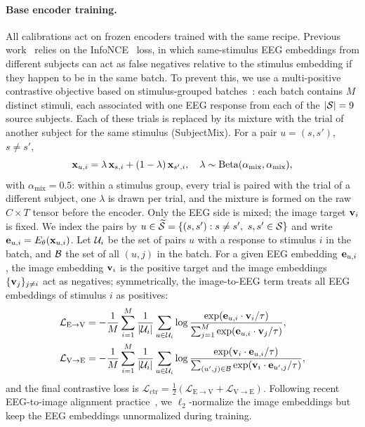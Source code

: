 \documentclass[10pt,twocolumn,letterpaper]{article}
\begin{document}
\paragraph{Base encoder training.}
All calibrations act on frozen encoders trained with the same recipe. Previous work~\cite{song2024nice,li2024atm,wu2025ubp,zhang2025neurobridge,du2025shallow} relies on the InfoNCE~\cite{oord2019cpc} loss, in which same-stimulus EEG embeddings from different subjects can act as false negatives relative to the stimulus embedding if they happen to be in the same batch. To prevent this, we use a multi-positive contrastive objective based on stimulus-grouped batches~\cite{khosla2020supcon}: each batch contains $M$ distinct stimuli, each associated with one EEG response from each of the $|{\cal S}|=9$ source subjects. Each of these trials is replaced by its mixture with the trial of another subject for the same stimulus (SubjectMix). For a pair $u=(s,s')$, $s \neq s'$,
\begin{equation}\label{eq:subjmix}
  {\bf x}_{u,i} = \lambda\,{\bf x}_{s,i} + (1 - \lambda)\,{\bf x}_{s',i},
  \quad \lambda \sim \mathrm{Beta}(\alpha_{\mathrm{mix}}, \alpha_{\mathrm{mix}}),
\end{equation}
with $\alpha_{\mathrm{mix}}=0.5$: within a stimulus group, every trial is paired with the trial of a different subject, one $\lambda$ is drawn per trial, and the mixture is formed on the raw $C\times T$ tensor before the encoder. Only the EEG side is mixed; the image target ${\bf v}_i$ is fixed. We index the pairs by $u \in \widetilde{{\cal S}} = \{(s,s') : s \neq s',\ s,s' \in {\cal S}\}$ and write ${\bf e}_{u,i} = E_\theta({\bf x}_{u,i})$. Let ${\cal U}_i$ be the set of pairs $u$ with a response to stimulus $i$ in the batch, and ${\cal B}$ the set of all $(u,j)$ in the batch. For a given EEG embedding ${\bf e}_{u,i}$, the image embedding ${\bf v}_i$ is the positive target and the image embeddings $\{{\bf v}_j\}_{j\neq i}$ act as negatives; symmetrically, the image-to-EEG term treats all EEG embeddings of stimulus $i$ as positives:
\begin{align}
\mathcal{L}_{\mathrm{E \to V}} &=
-\frac{1}{M} \sum_{i=1}^{M} \frac{1}{|{\cal U}_i|}\sum_{u\in{\cal U}_i}
\log \frac{\exp({\bf e}_{u,i} \cdot {\bf v}_{i} / \tau)}{\sum_{j=1}^{M} \exp({\bf e}_{u,i} \cdot {\bf v}_{j} / \tau)}, \\
\mathcal{L}_{\mathrm{V \to E}} &=
-\frac{1}{M} \sum_{i=1}^{M} \frac{1}{|{\cal U}_i|}\sum_{u\in{\cal U}_i}
\log \frac{\exp({\bf v}_{i} \cdot {\bf e}_{u,i} / \tau)}{\sum_{(u',j)\in{\cal B}} \exp({\bf v}_{i} \cdot {\bf e}_{u',j} / \tau)},
\end{align}
and the final contrastive loss is $\mathcal{L}_{\mathrm{ctr}} = \frac{1}{2} ( \mathcal{L}_{\mathrm{E \to V}} + \mathcal{L}_{\mathrm{V \to E}} )$. Following recent EEG-to-image alignment practice~\cite{kneeland2025enigma,zhang2025neurobridge}, we $\ell_2$-normalize the image embeddings but keep the EEG embeddings unnormalized during training.
\end{document}
